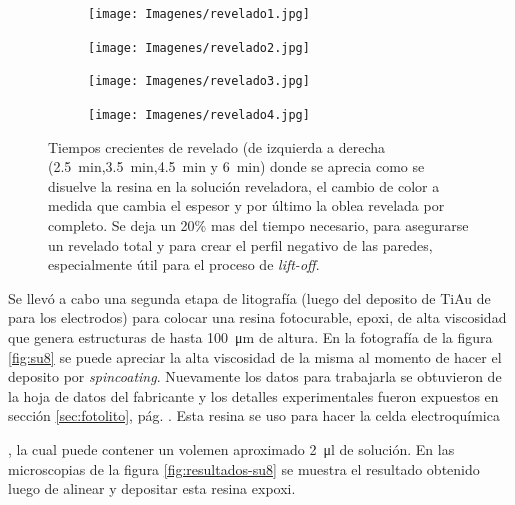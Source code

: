 { 				%
 				\begin{figure}[th]
			 	   	    \centering
			 	   	    \begin{subfigure}[t]{0.235\textwidth}
			        	\texttt{[image: Imagenes/revelado1.jpg]}
			       		\end{subfigure}
			     		\begin{subfigure}[t]{0.235\textwidth}
			     		\texttt{[image: Imagenes/revelado2.jpg]}
			    		\end{subfigure}
			     		\begin{subfigure}[t]{0.235\textwidth}
			         	\texttt{[image: Imagenes/revelado3.jpg]}
			        	\end{subfigure}
						\begin{subfigure}[t]{0.235\textwidth}
			     		\texttt{[image: Imagenes/revelado4.jpg]}
			        	\end{subfigure}
			     		\caption[Revelado en función del tiempo]{Tiempos crecientes de revelado (de izquierda  a derecha (\SI{2.5}{min},\SI{3.5}{min},\SI{4.5}{min} y \SI{6}{min}) donde se aprecia como se disuelve la resina en la solución reveladora, el cambio de color a medida que cambia el espesor y por último la oblea revelada por completo. Se deja un 20\% mas del tiempo necesario, para asegurarse un revelado total y para crear el perfil negativo de las paredes, especialmente útil para el proceso de\textit{ lift-off}.}
			     		\label{fig:revelado}
			     	   	\end{figure}

 		 Se llevó a cabo una segunda etapa de litografía (luego del deposito de Ti\textbar Au de para los electrodos) para colocar una resina fotocurable, epoxi, de alta viscosidad que genera estructuras de hasta \SI{100}{\um} de altura. En la fotografía de la figura \ref{fig:su8} se puede apreciar la alta viscosidad de la misma al momento de hacer el deposito por \textit{spincoating}. Nuevamente los datos para trabajarla se obtuvieron de la hoja de datos del fabricante\cite{Su8,Microchemicals2014} y los detalles experimentales fueron expuestos en  sección \ref{sec:fotolito}, pág. \pageref{sec:fotolito}. Esta resina se uso para hacer la celda electroquímica}, la cual puede contener un volemen aproximado \SI{2}{\ul} de solución. En las microscopias de la figura \ref{fig:resultados-su8} se muestra el resultado obtenido luego de alinear y depositar esta resina expoxi.

